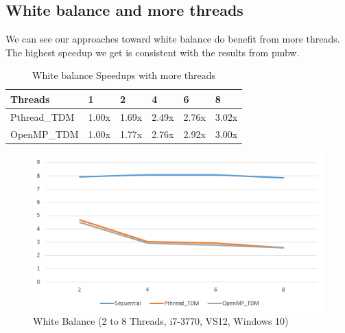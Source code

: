 \documentclass{acm_proc_article-sp}
\begin{document}
\subsection{White balance and more threads}
We can see our approaches toward white balance do benefit from more threads.
The highest speedup we get is consistent with the results from pmbw.
\begin{table}[H]
\centering
\caption{White balance Speedups with more threads}
\begin{tabular}{|l|l|l|l|l|l|} \hline
Threads&1&2&4&6&8\\ \hline
Pthread\_TDM & 1.00x & 1.69x & 2.49x & 2.76x & 3.02x \\ \hline
OpenMP\_TDM & 1.00x & 1.77x & 2.76x & 2.92x & 3.00x \\ \hline
\end{tabular}
\end{table}
\begin{figure}[H]
  \includegraphics[width=\linewidth,natwidth=575,natheight=312]{white_morethreads.png}
  \caption{White Balance (2 to 8 Threads, i7-3770, VS12, Windows 10)}
  \label{fig:white_morethreads}
\end{figure}
\end{document}
